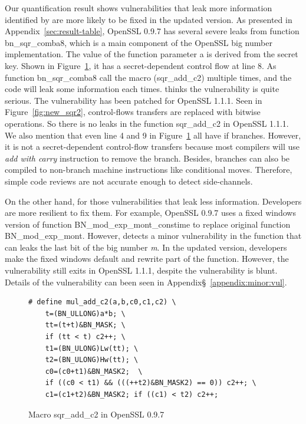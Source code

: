Our quantification result shows vulnerabilities
that leak more information identified by \tool{} 
are more likely to be fixed in the updated version.
As presented in Appendix~\ref{sec:result-table}, 
OpenSSL 0.9.7 has several severe leaks from
function \textsf{bn\_sqr\_comba8}, which is a main 
component of the OpenSSL big number implementation.
The value of the function parameter \textsf{a} is derived from
the secret key. 
Shown in Figure~\ref{fig:old_sqr2}, it has a 
secret-dependent control flow at line 8.
As function \textsf{bn\_sqr\_comba8}
call the macro (\textsf{sqr\_add\_c2}) multiple times, 
and the code will leak some information each times.
\tool{} thinks the vulnerability is quite serious. 
The vulnerability has been patched for OpenSSL 1.1.1. Seen in 
Figure~\ref{fig:new_sqr2}, control-flows transfers are replaced
with bitwise operations. So there is no leaks in the function
\textsf{sqr\_add\_c2} in OpenSSL 1.1.1. We also mention
that even line 4 and 9 in Figure~\ref{fig:old_sqr2} all have if branches.
However, it is not a secret-dependent control-flow transfers because
most compilers will use \emph{add with carry} instruction to remove the branch.
Besides, branches can also be compiled to non-branch machine instructions 
like conditional moves. Therefore, simple code reviews are not accurate
enough to detect side-channels. 

On the other hand, for those vulnerabilities that leak less information. 
Developers are more resilient to fix them. 
For example, OpenSSL 0.9.7 uses a fixed windows version of 
function \textsf{BN\_mod\_exp\_mont\_constime} to replace original function
\textsf{BN\_mod\_exp\_mont}.
However, \tool{} detects a minor vulnerability in the function that can
leaks the last bit of the big number \emph{m}. In the updated version,
developers make the fixed windows default and rewrite part of the 
function. However, the vulnerability still exits in OpenSSL 1.1.1,
despite the vulnerability is blunt. Details of the 
vulnerability can been seen in Appendix\S~\ref{appendix:minor:vul}.

\begin{figure}
    \centering
    \begin{lstlisting}[xleftmargin=.02\textwidth,xrightmargin=.01\textwidth]
# define mul_add_c2(a,b,c0,c1,c2) \
    t=(BN_ULLONG)a*b; \
    tt=(t+t)&BN_MASK; \
    if (tt < t) c2++; \
    t1=(BN_ULONG)Lw(tt); \
    t2=(BN_ULONG)Hw(tt); \
    c0=(c0+t1)&BN_MASK2;  \
    if ((c0 < t1) && (((++t2)&BN_MASK2) == 0)) c2++; \
    c1=(c1+t2)&BN_MASK2; if ((c1) < t2) c2++;
\end{lstlisting}
    \vspace*{-6pt}
    \caption{Macro \textsf{sqr\_add\_c2} in OpenSSL 0.9.7}
    \label{fig:old_sqr2}
    \vspace*{-6pt}
\end{figure}



